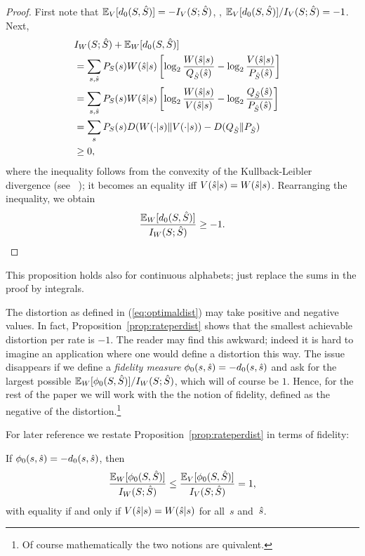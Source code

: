 \begin{proof}
  First note that ${\mathbb{E}_V}[{d_0}(S,{\hat{S}})] = -I_V(S;{\hat{S}})$, \ie,
  ${\mathbb{E}_V}[{d_0}(S,{\hat{S}})]/I_V(S;{\hat{S}}) = -1$. Next,
  \begin{align*}
    \lefteqn{\Iw(S;\Sh) + \Ew[\dz(S,\Sh)]} \\
    &=
    \sum_{s,\sh} \ps(s)W(\sh|s) \left[ \log_2 \frac{W(\sh|s)}{\qsh(\sh)} -
    \log_2 \frac{V(\sh|s)}{\psh(\sh)} \right] \\
    &= \sum_{s,\sh} \ps(s)W(\sh|s) \left[ \log_2\frac{W(\sh|s)}{V(\sh|s)} -
    \log_2 \frac{\qsh(\sh)}{\psh(\sh)} \right] \\
    &= \sum_s \ps(s) D(W(\cdot|s) \| V(\cdot |s)) - D(\qsh \| \psh) \\
    &\ge 0,
  \end{align*}
  where the inequality follows from the convexity of the Kullback-Leibler
  divergence (see \eg~\cite[Thm~2.7.2]{CoverT1991}); it becomes an equality iff
  $V({\hat{s}}|s) = W({\hat{s}}|s)$. Rearranging the inequality, we obtain
  \[ \frac{{\mathbb{E}_W}[{d_0}(S,{\hat{S}})]}{I_W(S;{\hat{S}})} \ge -1. \]
\end{proof}


\begin{remark}
  This proposition holds also for continuous alphabets; just replace the
  sums in the proof by integrals.
\end{remark}

The distortion as defined in (\ref{eq:optimaldist}) may take positive and
negative values. In fact, Proposition~\ref{prop:rateperdist} shows that the
smallest achievable distortion per rate is $-1$.  The reader may find this
awkward; indeed it is hard to imagine an application where one would define a
distortion this way. The issue disappears if we define a {\em fidelity measure}
$\phi_0(s,{\hat{s}})=- {d_0}(s, {\hat{s}})$ and ask for the largest possible ${\mathbb{E}_W}[{\phi_0}(S,{\hat{S}})]
/ I_W(S;{\hat{S}})$, which will of course be $1$. Hence, for the rest of the paper we
will work with the the notion of fidelity, defined as the negative of the
distortion.\footnote{Of course mathematically the two notions are
quivalent.}

For later reference we restate Proposition~\ref{prop:rateperdist} in terms of
fidelity:

\begin{proposition}
  If ${\phi_0}(s,{\hat{s}}) = -{d_0}(s,{\hat{s}})$, then
  \label{prop:rateperfid}
  \begin{equation}
    \label{eq:rateperfid}
    \frac{{\mathbb{E}_W}[\phi_0(S,{\hat{S}})]}{I_W(S;{\hat{S}})} \leq
    \frac{{\mathbb{E}_V}[\phi_0(S,{\hat{S}})]}{I_V(S;{\hat{S}})} = 1,
  \end{equation}
  with equality if and only if $V({\hat{s}}|s) = W({\hat{s}}|s)$ for all~$s$ and~${\hat{s}}$.
\end{proposition}

